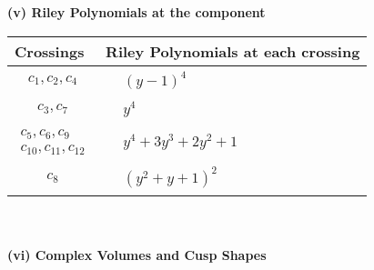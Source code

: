 \documentclass[1p]{elsarticle_modified}
\theoremstyle{definition}
\begin{document}
\newpage\renewcommand{\arraystretch}{1}
\flushleft \textbf{(v) Riley Polynomials at the component}\newline \\
\begin{tabular}{m{50pt}|m{274pt}}
Crossings & \hspace{64pt}Riley Polynomials at each crossing \\
\hline $$\begin{aligned}c_{1},c_{2},c_{4}\end{aligned}$$&$\begin{aligned}
&(y-1)^4
\end{aligned}$\\
\hline $$\begin{aligned}c_{3},c_{7}\end{aligned}$$&$\begin{aligned}
&y^4
\end{aligned}$\\
\hline $$\begin{aligned}c_{5},c_{6},c_{9}\\c_{10},c_{11},c_{12}\end{aligned}$$&$\begin{aligned}
&y^4+3 y^3+2 y^2+1
\end{aligned}$\\
\hline $$\begin{aligned}c_{8}\end{aligned}$$&$\begin{aligned}
&(y^2+y+1)^2
\end{aligned}$\\
\hline
\end{tabular}\\~\\
\newpage\flushleft \textbf{(vi) Complex Volumes and Cusp Shapes}
\end{document}
